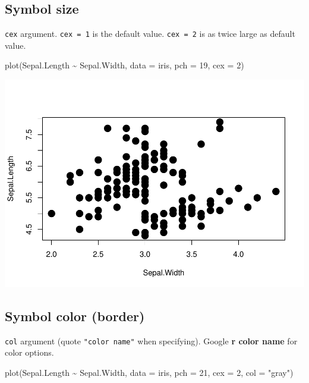 \documentclass[
]{book}
\newenvironment{Shaded}{\begin{snugshade}}{\end{snugshade}}
\newcommand{\AttributeTok}[1]{\textcolor[rgb]{0.77,0.63,0.00}{#1}}
\newcommand{\DecValTok}[1]{\textcolor[rgb]{0.00,0.00,0.81}{#1}}
\newcommand{\FunctionTok}[1]{\textcolor[rgb]{0.00,0.00,0.00}{#1}}
\newcommand{\NormalTok}[1]{#1}
\newcommand{\SpecialCharTok}[1]{\textcolor[rgb]{0.00,0.00,0.00}{#1}}
\newcommand{\StringTok}[1]{\textcolor[rgb]{0.31,0.60,0.02}{#1}}
\begin{document}
\hypertarget{symbol-size}{%
\subsection{Symbol size}\label{symbol-size}}

\texttt{cex} argument. \texttt{cex\ =\ 1} is the default value. \texttt{cex\ =\ 2} is as twice large as default value.

\begin{Shaded}
\begin{Highlighting}[]
\FunctionTok{plot}\NormalTok{(Sepal.Length }\SpecialCharTok{\textasciitilde{}}\NormalTok{ Sepal.Width, }\AttributeTok{data =}\NormalTok{ iris,}
     \AttributeTok{pch =} \DecValTok{19}\NormalTok{, }\AttributeTok{cex =} \DecValTok{2}\NormalTok{)}
\end{Highlighting}
\end{Shaded}

\begin{center}\includegraphics{_main_files/figure-latex/unnamed-chunk-118-1} \end{center}

\hypertarget{symbol-color-border}{%
\subsection{Symbol color (border)}\label{symbol-color-border}}

\texttt{col} argument (quote \texttt{"color\ name"} when specifying). Google \textbf{r color name} for color options.

\begin{Shaded}
\begin{Highlighting}[]
\FunctionTok{plot}\NormalTok{(Sepal.Length }\SpecialCharTok{\textasciitilde{}}\NormalTok{ Sepal.Width, }\AttributeTok{data =}\NormalTok{ iris,}
     \AttributeTok{pch =} \DecValTok{21}\NormalTok{, }\AttributeTok{cex =} \DecValTok{2}\NormalTok{, }\AttributeTok{col =} \StringTok{"gray"}\NormalTok{)}
\end{Highlighting}
\end{Shaded}
\end{document}
